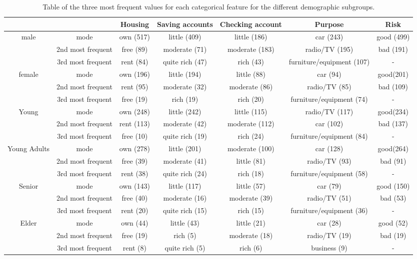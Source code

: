 \documentclass[conference]{IEEEtran}
\begin{document}
\begin{table*}[h]
\begin{center}
\caption{Table of the three most frequent values for each categorical feature for the different demographic subgroups.}
\begin{tabular}{ |c|c|c|c|c|c|c| } 
    \hline
    & & Housing & Saving accounts & Checking account & Purpose & Risk \\ 
    \hline
    \multirow{3}{4em}{male} 
    & mode              & own (517) & little (409) & little (186) & car (243) & good (499)\\ 
    & 2nd most frequent & free (89) & moderate (71) & moderate (183) & radio/TV (195) & bad (191)\\ 
    & 3rd most frequent & rent (84) & quite rich (47) & rich (43) & furniture/equipment (107) & - \\ 
    \hline
    \multirow{3}{4em}{female} 
    & mode              & own (196) & little (194) & little (88) & car (94) & good(201) \\ 
    & 2nd most frequent & rent (95) & moderate (32) & moderate (86) & radio/TV (85) & bad (109) \\
    & 3rd most frequent & free (19) & rich (19) & rich (20) & furniture/equipment (74) & - \\ 
    \hline
    \multirow{3}{4em}{Young} 
    & mode              & own (248) & little (242) & little (115) & radio/TV (117) & good(234) \\ 
    & 2nd most frequent & rent (113) & moderate (42) & moderate (112) & car (102) & bad (137) \\
    & 3rd most frequent & free (10) & quite rich (19) & rich (24) & furniture/equipment (84) & - \\ 
    \hline
    \multirow{3}{4em}{Young Adults} 
    & mode              & own (278) & little (201) & moderate (100) & car (128) & good(264) \\ 
    & 2nd most frequent & free (39) & moderate (41) & little (81) & radio/TV (93) & bad (91) \\
    & 3rd most frequent & rent (38) & quite rich (24) & rich (18) & furniture/equipment (58) & - \\
    \hline 
    \multirow{3}{4em}{Senior} 
    & mode              & own (143) & little (117) & little (57) & car (79)& good (150)\\
    & 2nd most frequent & free (40) & moderate (16) & moderate (39) & radio/TV (51) & bad (53) \\
    & 3rd most frequent & rent (20) & quite rich (15) & rich (15) & furniture/equipment (36) & -\\ 
    \hline
    \multirow{3}{4em}{Elder} 
    & mode              & own (44) & little (43) & little (21) & car (28) & good (52) \\ 
    & 2nd most frequent & free (19) & rich (5) & moderate (18) & radio/TV (19)& bad (19)\\
    & 3rd most frequent & rent (8) & quite rich (5) & rich (6) & business (9) & - \\ 
    \hline
\end{tabular}
\label{table:3}
\end{center}
\end{table*}
\end{document}
